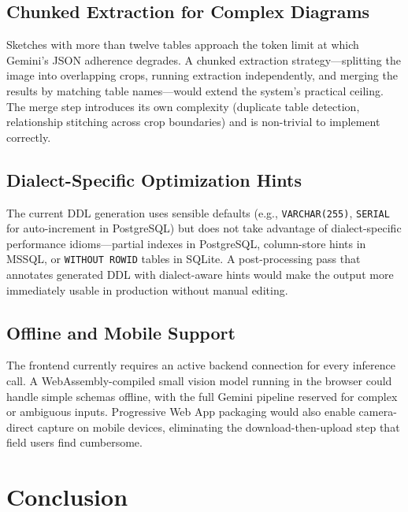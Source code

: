 \documentclass[conference]{IEEEtran}
\begin{document}
\subsection{Chunked Extraction for Complex Diagrams}

Sketches with more than twelve tables approach the token limit at
which Gemini's JSON adherence degrades. A chunked extraction
strategy---splitting the image into overlapping crops, running
extraction independently, and merging the results by matching
table names---would extend the system's practical ceiling. The
merge step introduces its own complexity (duplicate table detection,
relationship stitching across crop boundaries) and is non-trivial
to implement correctly.

\subsection{Dialect-Specific Optimization Hints}

The current DDL generation uses sensible defaults (e.g.,
\texttt{VARCHAR(255)}, \texttt{SERIAL} for auto-increment in
PostgreSQL) but does not take advantage of dialect-specific
performance idioms---partial indexes in PostgreSQL, column-store
hints in MSSQL, or \texttt{WITHOUT ROWID} tables in SQLite.
A post-processing pass that annotates generated DDL with
dialect-aware hints would make the output more immediately
usable in production without manual editing.

\subsection{Offline and Mobile Support}

The frontend currently requires an active backend connection for
every inference call. A WebAssembly-compiled small vision model
running in the browser could handle simple schemas offline, with
the full Gemini pipeline reserved for complex or ambiguous inputs.
Progressive Web App packaging would also enable camera-direct
capture on mobile devices, eliminating the download-then-upload
step that field users find cumbersome.

\section{Conclusion}
\end{document}
